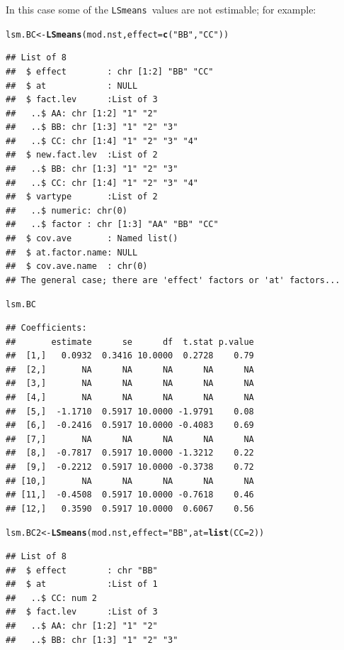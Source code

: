 \documentclass[10pt]{article}\usepackage[]{graphicx}\usepackage[]{color}
\makeatletter
\newcommand{\hlnum}[1]{\textcolor[rgb]{0.686,0.059,0.569}{#1}}%
\newcommand{\hlstr}[1]{\textcolor[rgb]{0.192,0.494,0.8}{#1}}%
\newcommand{\hlstd}[1]{\textcolor[rgb]{0.345,0.345,0.345}{#1}}%
\newcommand{\hlkwb}[1]{\textcolor[rgb]{0.69,0.353,0.396}{#1}}%
\newcommand{\hlkwc}[1]{\textcolor[rgb]{0.333,0.667,0.333}{#1}}%
\newcommand{\hlkwd}[1]{\textcolor[rgb]{0.737,0.353,0.396}{\textbf{#1}}}%
\newenvironment{kframe}{%
 \def\at@end@of@kframe{}%
 \ifinner\ifhmode%
  \def\at@end@of@kframe{\end{minipage}}%
  \begin{minipage}{\columnwidth}%
 \fi\fi%
 \def\FrameCommand##1{\hskip\@totalleftmargin \hskip-\fboxsep
 \colorbox{shadecolor}{##1}\hskip-\fboxsep
     \hskip-\linewidth \hskip-\@totalleftmargin \hskip\columnwidth}%
 \MakeFramed {\advance\hsize-\width
   \@totalleftmargin\z@ \linewidth\hsize
   \@setminipage}}%
 {\par\unskip\endMakeFramed%
 \at@end@of@kframe}
\newenvironment{knitrout}{}{} %
\def\code#1{\texttt{#1}}
\def\lsmeans{\code{LSmeans}}
\makeatother
\begin{document}
In this case some of the \lsmeans\ values are not estimable; for example:
\begin{knitrout}
\color{fgcolor}\begin{kframe}
\begin{alltt}
\hlstd{lsm.BC} \hlkwb{<-} \hlkwd{LSmeans}\hlstd{(mod.nst,} \hlkwc{effect}\hlstd{=}\hlkwd{c}\hlstd{(}\hlstr{"BB"}\hlstd{,} \hlstr{"CC"}\hlstd{))}
\end{alltt}
\begin{verbatim}
## List of 8
##  $ effect        : chr [1:2] "BB" "CC"
##  $ at            : NULL
##  $ fact.lev      :List of 3
##   ..$ AA: chr [1:2] "1" "2"
##   ..$ BB: chr [1:3] "1" "2" "3"
##   ..$ CC: chr [1:4] "1" "2" "3" "4"
##  $ new.fact.lev  :List of 2
##   ..$ BB: chr [1:3] "1" "2" "3"
##   ..$ CC: chr [1:4] "1" "2" "3" "4"
##  $ vartype       :List of 2
##   ..$ numeric: chr(0) 
##   ..$ factor : chr [1:3] "AA" "BB" "CC"
##  $ cov.ave       : Named list()
##  $ at.factor.name: NULL
##  $ cov.ave.name  : chr(0) 
## The general case; there are 'effect' factors or 'at' factors...
\end{verbatim}
\begin{alltt}
\hlstd{lsm.BC}
\end{alltt}
\begin{verbatim}
## Coefficients:
##       estimate      se      df  t.stat p.value
##  [1,]   0.0932  0.3416 10.0000  0.2728    0.79
##  [2,]       NA      NA      NA      NA      NA
##  [3,]       NA      NA      NA      NA      NA
##  [4,]       NA      NA      NA      NA      NA
##  [5,]  -1.1710  0.5917 10.0000 -1.9791    0.08
##  [6,]  -0.2416  0.5917 10.0000 -0.4083    0.69
##  [7,]       NA      NA      NA      NA      NA
##  [8,]  -0.7817  0.5917 10.0000 -1.3212    0.22
##  [9,]  -0.2212  0.5917 10.0000 -0.3738    0.72
## [10,]       NA      NA      NA      NA      NA
## [11,]  -0.4508  0.5917 10.0000 -0.7618    0.46
## [12,]   0.3590  0.5917 10.0000  0.6067    0.56
\end{verbatim}
\begin{alltt}
\hlstd{lsm.BC2} \hlkwb{<-} \hlkwd{LSmeans}\hlstd{(mod.nst,} \hlkwc{effect}\hlstd{=}\hlstr{"BB"}\hlstd{,} \hlkwc{at}\hlstd{=}\hlkwd{list}\hlstd{(}\hlkwc{CC}\hlstd{=}\hlnum{2}\hlstd{))}
\end{alltt}
\begin{verbatim}
## List of 8
##  $ effect        : chr "BB"
##  $ at            :List of 1
##   ..$ CC: num 2
##  $ fact.lev      :List of 3
##   ..$ AA: chr [1:2] "1" "2"
##   ..$ BB: chr [1:3] "1" "2" "3"

\end{verbatim}
\end{kframe}
\end{knitrout}
\end{document}
